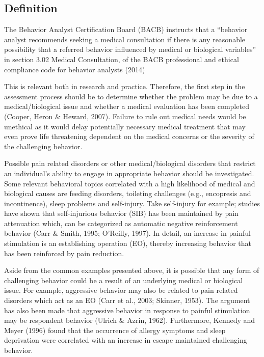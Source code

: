 \subsection{Definition}
The Behavior Analyst Certification Board (BACB) instructs that a ``behavior analyst recommends seeking a medical consultation if there is any reasonable possibility that a referred behavior influenced by medical or biological variables'' in section 3.02 Medical Consultation, of the BACB professional and ethical compliance code for behavior analysts (2014)

This is relevant both in research and practice. Therefore, the first step in the assessment process should be to determine whether the problem may be due to a medical/biological issue and whether a medical evaluation has been completed (Cooper, Heron \& Heward, 2007). Failure to rule out medical needs would be unethical as it would delay potentially necessary medical treatment that may even prove life threatening dependent on the medical concerns or the severity of the challenging behavior.

Possible pain related disorders or other medical/biological disorders that restrict an individual's ability to engage in appropriate behavior should be investigated.  Some relevant behavioral topics correlated with a high likelihood of medical and biological causes are feeding disorders, toileting challenges (e.g., encopresis and incontinence), sleep problems and self-injury. Take self-injury for example; studies have shown that self-injurious behavior (SIB) has been maintained by pain attenuation which, can be categorized as automatic negative reinforcement behavior (Carr \& Smith, 1995; O'Reilly, 1997).  In detail, an increase in painful stimulation is an establishing operation (EO), thereby increasing behavior that has been reinforced by pain reduction.

Aside from the common examples presented above, it is possible that any form of challenging behavior could be a result of an underlying medical or biological issue. For example, aggressive behavior may also be related to pain related disorders which act as an EO (Carr et al., 2003; Skinner, 1953). The argument has also been made that aggressive behavior in response to painful stimulation may be respondent behavior (Ulrich \& Azrin, 1962). Furthermore, Kennedy and Meyer (1996) found that the occurrence of allergy symptoms and sleep deprivation were correlated with an increase in escape maintained challenging behavior. 

